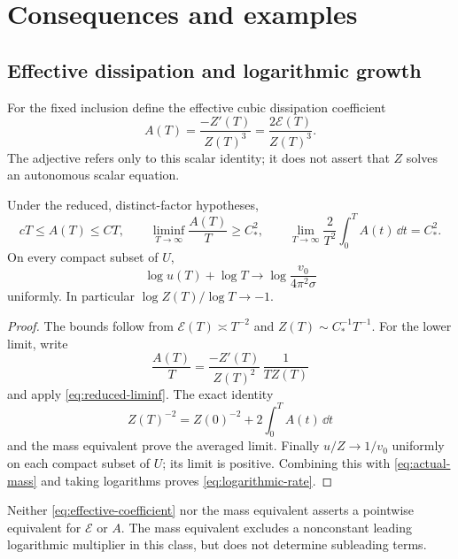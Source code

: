 \section{Consequences and examples}\label{sec:consequences}

\subsection{Effective dissipation and logarithmic growth}

For the fixed inclusion define the effective cubic dissipation
coefficient
\[
 A(T)=\frac{-Z'(T)}{Z(T)^3}
     =\frac{2\mathcal E(T)}{Z(T)^3}.
\]
The adjective refers only to this scalar identity; it does not
assert that \(Z\) solves an autonomous scalar equation.

\begin{corollary}\label{cor:dissipation-coefficient}
Under the reduced, distinct-factor hypotheses,
\begin{equation}\label{eq:effective-coefficient}
 cT\le A(T)\le CT,\qquad
 \liminf_{T\to\infty}\frac{A(T)}T\ge C_*^2,\qquad
 \lim_{T\to\infty}\frac2{T^2}\int_0^T A(t)\,\dd t=C_*^2.
\end{equation}
On every compact subset of \(U\),
\begin{equation}\label{eq:logarithmic-rate}
 \log u(T)+\log T
 \longrightarrow \log\frac{v_0}{4\pi^2\sigma}
\end{equation}
uniformly. In particular \(\log Z(T)/\log T\to-1\).
\end{corollary}

\begin{proof}
The bounds follow from \(\mathcal E(T)\asymp T^{-2}\)
and \(Z(T)\sim C_*^{-1}T^{-1}\).
For the lower limit, write
\[
 \frac{A(T)}T
 =\frac{-Z'(T)}{Z(T)^2}\,\frac1{TZ(T)}
\]
and apply \eqref{eq:reduced-liminf}. The exact identity
\[
 Z(T)^{-2}=Z(0)^{-2}+2\int_0^T A(t)\,\dd t
\]
and the mass equivalent prove the averaged limit.
Finally \(u/Z\to1/v_0\) uniformly on each compact
subset of \(U\); its limit is positive. Combining
this with \eqref{eq:actual-mass} and taking logarithms
proves \eqref{eq:logarithmic-rate}.
\end{proof}

Neither \eqref{eq:effective-coefficient} nor the mass equivalent
asserts a pointwise equivalent for \(\mathcal E\) or \(A\).
The mass equivalent excludes a nonconstant leading logarithmic
multiplier in this class, but does not determine subleading terms.

